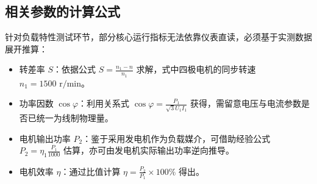 \begin{framed}
{			\subsection{相关参数的计算公式}
			针对负载特性测试环节，部分核心运行指标无法依靠仪表直读，必须基于实测数据展开推算：
			\begin{itemize}
				\item 转差率 $S$：依据公式 $S = \frac{n_1 - n}{n_1}$ 求解，式中四极电机的同步转速 $n_1 = 1500 \text{ r/min}$。
				\item 功率因数 $\cos\varphi$：利用关系式 $\cos\varphi = \frac{P_1}{\sqrt{3} U_1 I_1}$ 获得，需留意电压与电流参数是否已统一为线制物理量。
				\item 电机输出功率 $P_2$：鉴于采用发电机作为负载媒介，可借助经验公式 $P_2 = \eta_1 \frac{P_1}{1000}$ 估算，亦可由发电机实际输出功率逆向推导。
				\item 电机效率 $\eta$：通过比值计算 $\eta = \frac{P_2}{P_1} \times 100\% $ 得出。
			\end{itemize}
			
}
\end{framed}
